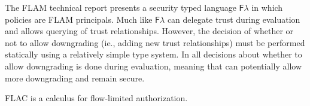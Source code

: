 The FLAM technical report \cite{flamtr} presents a security typed language $\mathsf{F}\lambda$ in which policies are FLAM principals. Much like \lang{} $\mathsf{F}\lambda$ can delegate trust during evaluation and allows querying of trust relationships. However, the decision of whether or not to allow downgrading (ie., adding new trust relationships) must be performed statically using a relatively simple type system. In \lang{} all decisions about whether to allow downgrading is done during evaluation, meaning that \lang{} can potentially allow more downgrading and remain secure.

FLAC \cite{7536372} is a calculus for flow-limited authorization. 

